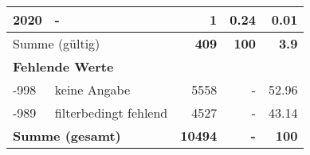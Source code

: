 \begin{longtable}{lXrrr}
     2020 &
     \multicolumn{1}{X}{ -  } &


       \num{1} &
       \num[round-mode=places,round-precision=2]{0,24} &
         \num[round-mode=places,round-precision=2]{0,01} \\
     \midrule
     \multicolumn{2}{l}{Summe (gültig)} &
       \textbf{\num{409}} &
     \textbf{100} &
       \textbf{\num[round-mode=places,round-precision=2]{3,9}} \\
     \multicolumn{5}{l}{\textbf{Fehlende Werte}}\\
       -998 &
       keine Angabe &
         \num{5558} &
        - &
         \num[round-mode=places,round-precision=2]{52,96} \\
       -989 &
       filterbedingt fehlend &
         \num{4527} &
        - &
         \num[round-mode=places,round-precision=2]{43,14} \\
     \midrule
     \multicolumn{2}{l}{\textbf{Summe (gesamt)}} &
          \textbf{\num{10494}} &
        \textbf{-} &
        \textbf{100} \\
     \bottomrule
     \end{longtable}
     
